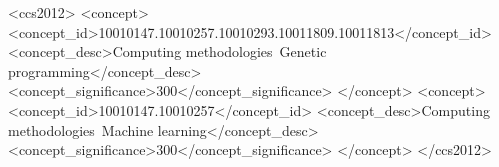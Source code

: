 \documentclass[manuscript, review, anonymous]{acmart} %
\begin{document}
\begin{CCSXML}
<ccs2012>
   <concept>
       <concept_id>10010147.10010257.10010293.10011809.10011813</concept_id>
       <concept_desc>Computing methodologies~Genetic programming</concept_desc>
       <concept_significance>300</concept_significance>
       </concept>
   <concept>
       <concept_id>10010147.10010257</concept_id>
       <concept_desc>Computing methodologies~Machine learning</concept_desc>
       <concept_significance>300</concept_significance>
       </concept>
 </ccs2012>
\end{CCSXML}





\received{-}
\received[revised]{-}
\received[accepted]{-}


\maketitle
\end{document}
